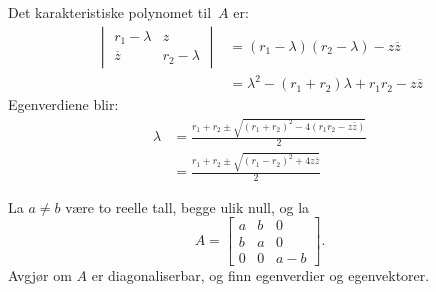\begin{losning}
Det karakteristiske polynomet til~$A$ er:
\begin{align*}
\begin{vmatrix}
r_1 - \lambda & z             \\
\overline{z}  & r_2 - \lambda
\end{vmatrix}
&= (r_1 - \lambda)(r_2 - \lambda) - z \overline{z} \\
&= \lambda^2 - (r_1 + r_2) \lambda + r_1 r_2 - z \overline{z}
\end{align*}
Egenverdiene blir:
\begin{align*}
\lambda
&= \frac{r_1 + r_2 \pm \sqrt{(r_1 + r_2)^2 - 4 (r_1 r_2 - z \overline{z})}}{2} \\
&= \frac{r_1 + r_2 \pm \sqrt{(r_1 - r_2)^2 + 4 z \overline{z}}}{2}
\end{align*}
\end{losning}


\begin{oppgave}
La $ a\neq b$ være to reelle tall, begge ulik null, og la
$$A=
\begin{bmatrix}
a & b & 0\\
b & a & 0\\
0 & 0 & a-b
\end{bmatrix}.$$
Avgjør om $A$ er diagonaliserbar, og finn egenverdier og egenvektorer.
\end{oppgave}


